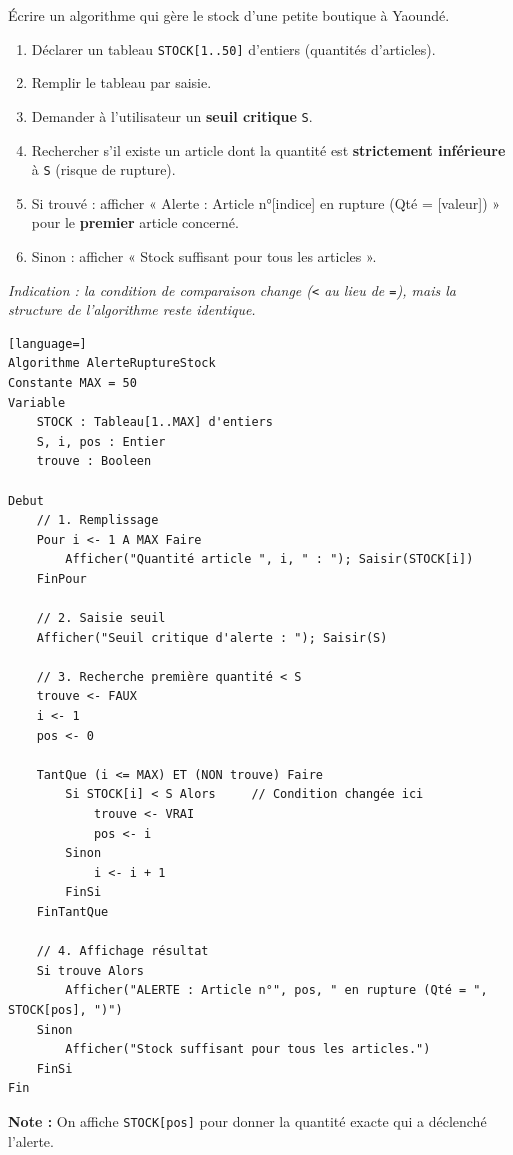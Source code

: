 \documentclass[11pt]{article}
\begin{document}
\begin{exercice}
Écrire un algorithme qui gère le stock d'une petite boutique à Yaoundé.
\begin{enumerate}
    \item Déclarer un tableau \texttt{STOCK[1..50]} d'entiers (quantités d'articles).
    \item Remplir le tableau par saisie.
    \item Demander à l'utilisateur un \textbf{seuil critique} \texttt{S}.
    \item Rechercher s'il existe un article dont la quantité est \textbf{strictement inférieure} à \texttt{S} (risque de rupture).
    \item Si trouvé : afficher « Alerte : Article n°[indice] en rupture (Qté = [valeur]) » pour le \textbf{premier} article concerné.
    \item Sinon : afficher « Stock suffisant pour tous les articles ».
\end{enumerate}
\textit{Indication : la condition de comparaison change (\texttt{<} au lieu de \texttt{=}), mais la structure de l'algorithme reste identique.}
\end{exercice}

\begin{corrige}
\begin{lstlisting}[language=]
Algorithme AlerteRuptureStock
Constante MAX = 50
Variable
    STOCK : Tableau[1..MAX] d'entiers
    S, i, pos : Entier
    trouve : Booleen

Debut
    // 1. Remplissage
    Pour i <- 1 A MAX Faire
        Afficher("Quantité article ", i, " : "); Saisir(STOCK[i])
    FinPour

    // 2. Saisie seuil
    Afficher("Seuil critique d'alerte : "); Saisir(S)

    // 3. Recherche première quantité < S
    trouve <- FAUX
    i <- 1
    pos <- 0

    TantQue (i <= MAX) ET (NON trouve) Faire
        Si STOCK[i] < S Alors     // Condition changée ici
            trouve <- VRAI
            pos <- i
        Sinon
            i <- i + 1
        FinSi
    FinTantQue

    // 4. Affichage résultat
    Si trouve Alors
        Afficher("ALERTE : Article n°", pos, " en rupture (Qté = ", STOCK[pos], ")")
    Sinon
        Afficher("Stock suffisant pour tous les articles.")
    FinSi
Fin
\end{lstlisting}
\textbf{Note :} On affiche \texttt{STOCK[pos]} pour donner la quantité exacte qui a déclenché l'alerte.
\end{corrige}
\end{document}
